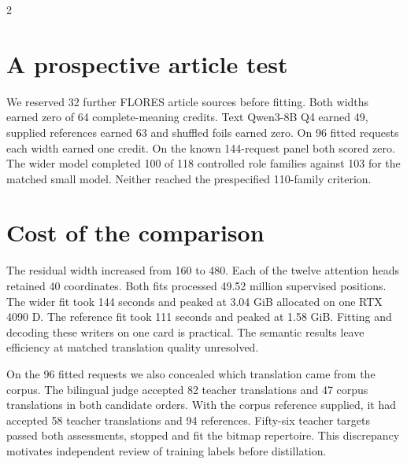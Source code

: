 \begin{multicols}{2}
\section*{A prospective article test}
We reserved 32 further FLORES article sources before fitting. Both widths earned zero of 64 complete-meaning credits. Text Qwen3-8B Q4 earned 49, supplied references earned 63 and shuffled foils earned zero. On 96 fitted requests each width earned one credit. On the known 144-request panel both scored zero. The wider model completed 100 of 118 controlled role families against 103 for the matched small model. Neither reached the prespecified 110-family criterion.
\section*{Cost of the comparison}
The residual width increased from 160 to 480. Each of the twelve attention heads retained 40 coordinates. Both fits processed 49.52 million supervised positions. The wider fit took 144 seconds and peaked at 3.04 GiB allocated on one RTX 4090 D. The reference fit took 111 seconds and peaked at 1.58 GiB. Fitting and decoding these writers on one card is practical. The semantic results leave efficiency at matched translation quality unresolved.
\par On the 96 fitted requests we also concealed which translation came from the corpus. The bilingual judge accepted 82 teacher translations and 47 corpus translations in both candidate orders. With the corpus reference supplied, it had accepted 58 teacher translations and 94 references. Fifty-six teacher targets passed both assessments, stopped and fit the bitmap repertoire. This discrepancy motivates independent review of training labels before distillation.
\end{multicols}

